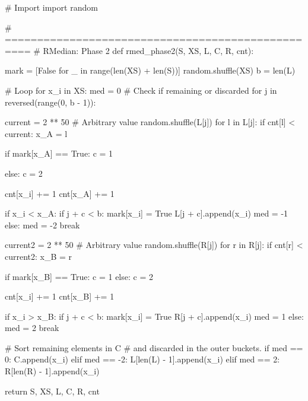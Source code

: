 \begin{python}
#   Import
import random

# ==================================================
#   RMedian: Phase 2
def rmed_phase2(S, XS, L, C, R, cnt):

    mark = [False for _ in range(len(XS) + len(S))]
    random.shuffle(XS)
    b = len(L)
    
    #	Loop
    for x_i in XS:
        med = 0	#	Check if remaining or discarded
        for j in reversed(range(0, b - 1)):

            current = 2 ** 50	# Arbitrary value
            random.shuffle(L[j])
            for l in L[j]:
                if cnt[l] < current:
                    x_A = l

            if mark[x_A] == True:
                c = 1

            else:
                c = 2

            cnt[x_i] += 1
            cnt[x_A] += 1

            if x_i < x_A:
                if j + c < b:
                    mark[x_i] = True
                    L[j + c].append(x_i)
                    med = -1
                else:
                    med = -2
                break

            current2 = 2 ** 50	# Arbitrary value
            random.shuffle(R[j])
            for r in R[j]:
                if cnt[r] < current2:
                    x_B = r

            if mark[x_B] == True:
                c = 1
            else:
                c = 2

            cnt[x_i] += 1
            cnt[x_B] += 1

            if x_i > x_B:
                if j + c < b:
                    mark[x_i] = True
                    R[j + c].append(x_i)
                    med = 1
                else:
                    med = 2
                break
        
        #	Sort remaining elements in C 
        # 	and discarded in the outer buckets.
        if med == 0:
            C.append(x_i)
        elif med == -2:
            L[len(L) - 1].append(x_i)
        elif med == 2:
            R[len(R) - 1].append(x_i)
    
    return S, XS, L, C, R, cnt
\end{python}